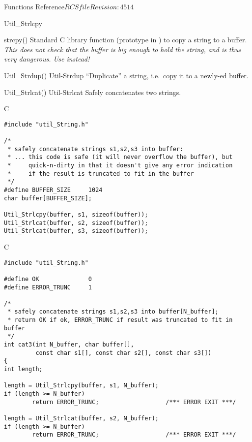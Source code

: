 \begin{cactuspart}{ Functions Reference}{$RCSfile$}{$Revision: 4514 $}
\begin{FunctionDescription}{Util\_Strlcpy}
\begin{SeeAlsoSection}
\begin{SeeAlso}{strcpy()}
Standard C library function (prototype in )
to copy a string to a buffer.
{\em This does not check that the buffer is big enough to hold the string,
and is thus very dangerous.  Use  instead!}
\end{SeeAlso}
\begin{SeeAlso2} {Util\_Strdup()} {Util-Strdup}
``Duplicate'' a string, i.e.\ copy it to a newly-ed buffer.
\end{SeeAlso2}
\begin{SeeAlso2} {Util\_Strlcat()} {Util-Strlcat}
Safely concatenates two strings.
\end{SeeAlso2}
\end{SeeAlsoSection}

\begin{ExampleSection}
\begin{Example}{C}
\begin{verbatim}
#include "util_String.h"

/*
 * safely concatenate strings s1,s2,s3 into buffer:
 * ... this code is safe (it will never overflow the buffer), but
 *     quick-n-dirty in that it doesn't give any error indication
 *     if the result is truncated to fit in the buffer
 */
#define BUFFER_SIZE     1024
char buffer[BUFFER_SIZE];

Util_Strlcpy(buffer, s1, sizeof(buffer));
Util_Strlcat(buffer, s2, sizeof(buffer));
Util_Strlcat(buffer, s3, sizeof(buffer));
\end{verbatim}
\end{Example}
\begin{Example}{C}
\begin{verbatim}
#include "util_String.h"

#define OK              0
#define ERROR_TRUNC     1

/*
 * safely concatenate strings s1,s2,s3 into buffer[N_buffer];
 * return OK if ok, ERROR_TRUNC if result was truncated to fit in buffer
 */
int cat3(int N_buffer, char buffer[],
         const char s1[], const char s2[], const char s3[])
{
int length;

length = Util_Strlcpy(buffer, s1, N_buffer);
if (length >= N_buffer)
        return ERROR_TRUNC;                   /*** ERROR EXIT ***/

length = Util_Strlcat(buffer, s2, N_buffer);
if (length >= N_buffer)
        return ERROR_TRUNC;                   /*** ERROR EXIT ***/


\end{verbatim}
\end{Example}
\end{ExampleSection}
\end{FunctionDescription}
\end{cactuspart}
